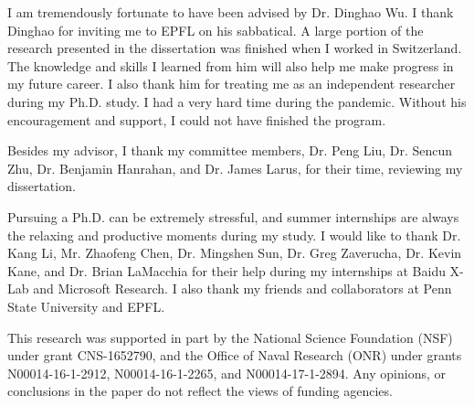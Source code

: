 I am tremendously fortunate to have been advised by Dr. Dinghao Wu.  I thank Dinghao for inviting me to EPFL on his sabbatical. A large portion of the research presented in the dissertation was finished when I worked in Switzerland. The knowledge and skills I learned from him will also help me make progress in my future career. I also thank him for treating me as an independent researcher during my Ph.D. study. I had a very hard time during the pandemic. Without his encouragement and support, I could not have finished the program.

Besides my advisor, I thank my committee members, Dr. Peng Liu, Dr. Sencun Zhu, Dr. Benjamin Hanrahan, and Dr. James Larus, for their time, reviewing my dissertation. 

Pursuing a Ph.D. can be extremely stressful, and summer internships are always the relaxing and productive moments during my study. I would like to thank Dr. Kang Li, Mr. Zhaofeng Chen, Dr. Mingshen Sun, Dr. Greg Zaverucha, Dr. Kevin Kane, and Dr. Brian LaMacchia for their help during my internships at Baidu X-Lab and Microsoft Research.  I also thank my friends and collaborators at Penn State University and EPFL. 

This research was supported in part by the National Science Foundation (NSF) under grant CNS-1652790, and the Office of Naval Research (ONR) under grants N00014-16-1-2912, N00014-16-1-2265, and N00014-17-1-2894. Any opinions, or conclusions in the paper do not reflect the views of funding agencies.

